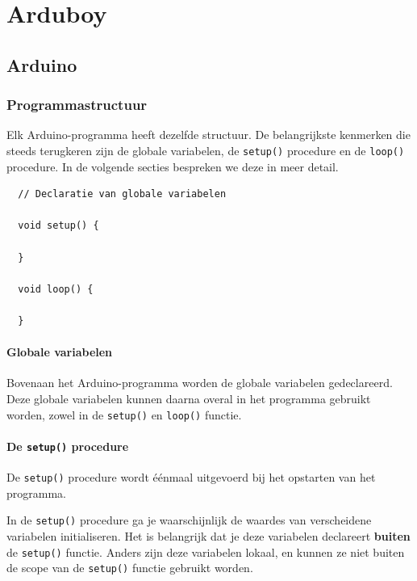 \documentclass[11pt,fleqn]{book} %
\begin{document}
\part{Arduboy}

\chapter{Arduino}
\section{Programmastructuur}
Elk Arduino-programma heeft dezelfde structuur. De belangrijkste kenmerken die steeds terugkeren zijn de globale variabelen, de \texttt{setup()} procedure en de \texttt{loop()} procedure. In de volgende secties bespreken we deze in meer detail.

\begin{definition}
	\phantom{}
	\begin{verbatim}
  // Declaratie van globale variabelen
  
  void setup() {
    
  }
  
  void loop() {
  
  }
	\end{verbatim}
	\vspace{0cm}
\end{definition}

\subsection{Globale variabelen}
Bovenaan het Arduino-programma worden de globale variabelen gedeclareerd. Deze globale variabelen kunnen daarna overal in het programma gebruikt worden, zowel in de \texttt{setup()} en \texttt{loop()} functie.

\subsection{De \texttt{setup()} procedure}
De \texttt{setup()} procedure wordt éénmaal uitgevoerd bij het opstarten van het programma.

\begin{remark}
	In de \texttt{setup()} procedure ga je waarschijnlijk de waardes van verscheidene variabelen initialiseren. Het is belangrijk dat je deze variabelen declareert \textbf{buiten} de \texttt{setup()} functie. Anders zijn deze variabelen lokaal, en kunnen ze niet buiten de scope van de \texttt{setup()} functie gebruikt worden.
\end{remark}
\end{document}
